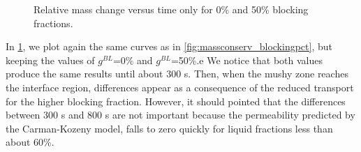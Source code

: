 \begin{figure}[htbp]
\centering
{}
\caption{Relative mass change versus time only for 0\% and 50\% blocking fractions.}
\label{fig:massconserv_blockingpct2}
\end{figure}



In \cref{fig:massconserv_blockingpct2}, we plot again the same curves as in \cref{fig:massconserv_blockingpct}, but keeping the values of $g^{BL}$=0\% and $g^{BL}$=50\%.e
We notice that both values produce the same results until about 300 s. Then, when the mushy zone reaches the interface region, differences appear as a consequence
of the reduced transport for the higher blocking fraction. However, it should pointed that the differences between 300 s and 800 s are not important because the permeability
predicted by the Carman-Kozeny model, falls to zero quickly for liquid fractions less than about 60\%. 

